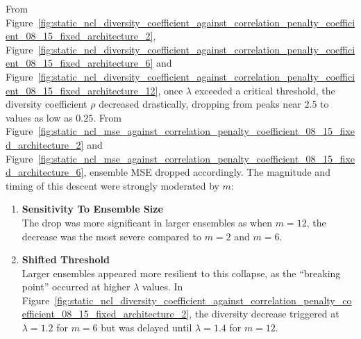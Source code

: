 From Figure~\ref{fig:static_ncl_diversity_coefficient_against_correlation_penalty_coefficient_08_15_fixed_architecture_2}, Figure~\ref{fig:static_ncl_diversity_coefficient_against_correlation_penalty_coefficient_08_15_fixed_architecture_6} and Figure~\ref{fig:static_ncl_diversity_coefficient_against_correlation_penalty_coefficient_08_15_fixed_architecture_12}, once $\lambda$ exceeded a critical threshold, the diversity coefficient $\rho$ decreased drastically, dropping from peaks near $2.5$ to values as low as $0.25$. From Figure~\ref{fig:static_ncl_mse_against_correlation_penalty_coefficient_08_15_fixed_architecture_2} and Figure~\ref{fig:static_ncl_mse_against_correlation_penalty_coefficient_08_15_fixed_architecture_6}, ensemble MSE dropped accordingly. The magnitude and timing of this descent were strongly moderated by $m$: 
\begin{enumerate}
    \item \textbf{Sensitivity To Ensemble Size} \\
    The drop was more significant in larger ensembles as when $m = 12$, the decrease was the most severe compared to $m = 2$ and $m = 6$. 

    \item \textbf{Shifted Threshold} \\
    Larger ensembles appeared more resilient to this collapse, as the ``breaking point'' occurred at higher $\lambda$ values. In Figure~\ref{fig:static_ncl_diversity_coefficient_against_correlation_penalty_coefficient_08_15_fixed_architecture_2}, the diversity decrease triggered at $\lambda = 1.2$ for $m = 6$ but was delayed until $\lambda = 1.4$ for $m = 12$. 
\end{enumerate}




